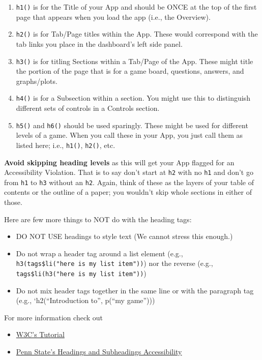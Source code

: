\documentclass[
]{book}
\providecommand{\tightlist}{%
  \setlength{\itemsep}{0pt}\setlength{\parskip}{0pt}}
\begin{document}
\begin{enumerate}
\def\labelenumi{\arabic{enumi}.}
\tightlist
\item
  \texttt{h1()} is for the Title of your App and should be ONCE at the top of the first page that appears when you load the app (i.e., the Overview).
\item
  \texttt{h2()} is for Tab/Page titles within the App. These would correspond with the tab links you place in the dashboard's left side panel.
\item
  \texttt{h3()} is for titling Sections within a Tab/Page of the App. These might title the portion of the page that is for a game board, questions, answers, and graphs/plots.
\item
  \texttt{h4()} is for a Subsection within a section. You might use this to distinguish different sets of controls in a Controls section.
\item
  \texttt{h5()} and \texttt{h6()} should be used sparingly. These might be used for different levels of a game. When you call these in your App, you just call them as listed here; i.e., \texttt{h1()}, \texttt{h2()}, etc.
\end{enumerate}

\textbf{Avoid skipping heading levels} as this will get your App flagged for an Accessibility Violation. That is to say don't start at \texttt{h2} with no \texttt{h1} and don't go from \texttt{h1} to \texttt{h3} without an \texttt{h2}. Again, think of these as the layers of your table of contents or the outline of a paper; you wouldn't skip whole sections in either of those.

Here are few more things to NOT do with the heading tags:

\begin{itemize}
\tightlist
\item
  DO NOT USE headings to style text (We cannot stress this enough.)
\item
  Do not wrap a header tag around a list element (e.g., \texttt{h3(tags\$li("here\ is\ my\ list\ item"))}) nor the reverse (e.g., \texttt{tags\$li(h3("here\ is\ my\ list\ item"))})
\item
  Do not mix header tags together in the same line or with the paragraph tag (e.g., `h2(``Introduction to'', p(``my game'')))
\end{itemize}

For more information check out

\begin{itemize}
\tightlist
\item
  \href{https://www.w3.org/WAI/tutorials/page-structure/headings/}{W3C's Tutorial}
\item
  \href{https://accessibility.psu.edu/headings/}{Penn State's Headings and Subheadings Accessibility}
\end{itemize}
\end{document}
